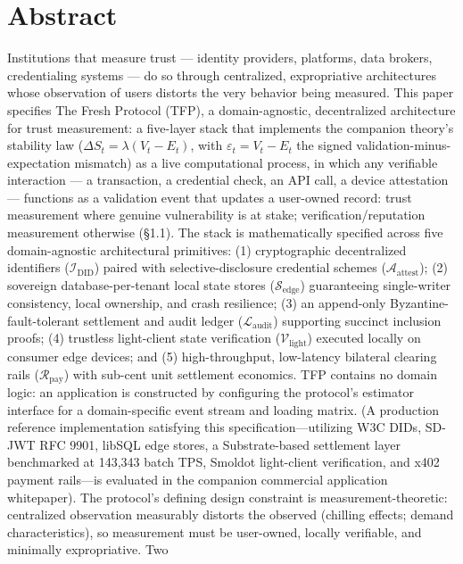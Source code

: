 \documentclass[
]{article}
\author{}
\date{}
\begin{document}
\section{Abstract}\label{abstract}

Institutions that measure trust --- identity providers, platforms, data
brokers, credentialing systems --- do so through centralized,
expropriative architectures whose observation of users distorts the very
behavior being measured. This paper specifies The Fresh Protocol (TFP),
a domain-agnostic, decentralized architecture for trust measurement: a
five-layer stack that implements the companion theory's stability law
(\(\Delta S_t = \lambda(V_t - E_t)\), with \(\varepsilon_t = V_t - E_t\)
the signed validation-minus-expectation mismatch) as a live
computational process, in which any verifiable interaction --- a
transaction, a credential check, an API call, a device attestation ---
functions as a validation event that updates a user-owned record: trust
measurement where genuine vulnerability is at stake;
verification/reputation measurement otherwise (§1.1). The stack is
mathematically specified across five domain-agnostic architectural
primitives: (1) cryptographic decentralized identifiers
(\(\mathcal{I}_{\text{DID}}\)) paired with selective-disclosure
credential schemes (\(\mathcal{A}_{\text{attest}}\)); (2) sovereign
database-per-tenant local state stores (\(\mathcal{S}_{\text{edge}}\))
guaranteeing single-writer consistency, local ownership, and crash
resilience; (3) an append-only Byzantine-fault-tolerant settlement and
audit ledger (\(\mathcal{L}_{\text{audit}}\)) supporting succinct
inclusion proofs; (4) trustless light-client state verification
(\(\mathcal{V}_{\text{light}}\)) executed locally on consumer edge
devices; and (5) high-throughput, low-latency bilateral clearing rails
(\(\mathcal{R}_{\text{pay}}\)) with sub-cent unit settlement economics.
TFP contains no domain logic: an application is constructed by
configuring the protocol's estimator interface for a domain-specific
event stream and loading matrix. (A production reference implementation
satisfying this specification---utilizing W3C DIDs, SD-JWT RFC 9901,
libSQL edge stores, a Substrate-based settlement layer benchmarked at
143,343 batch TPS, Smoldot light-client verification, and x402 payment
rails---is evaluated in the companion commercial application
whitepaper). The protocol's defining design constraint is
measurement-theoretic: centralized observation measurably distorts the
observed (chilling effects; demand characteristics), so measurement must
be user-owned, locally verifiable, and minimally expropriative. Two
\end{document}
